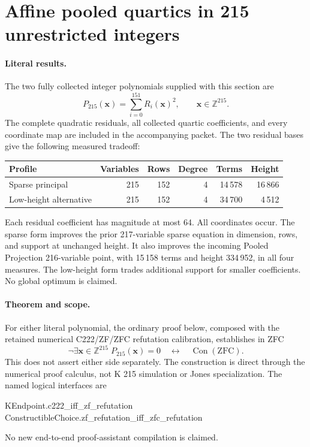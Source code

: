 \section{Affine pooled quartics in 215 unrestricted integers}
\label{sec:affine-pooled215}

\paragraph{Literal results.}
The two fully collected integer polynomials supplied with this section are
\[
 P_{215}(\boldsymbol x)=\sum_{i=0}^{151}R_i(\boldsymbol x)^2,
 \qquad \boldsymbol x\in\mathbb Z^{215}.
\]
The complete quadratic residuals, all collected quartic coefficients, and every
coordinate map are included in the accompanying packet.  The two residual
bases give the following measured tradeoff:
\begin{center}
\begin{tabular}{lrrrrr}
\hline
Profile & Variables & Rows & Degree & Terms & Height\\\hline
Sparse principal &215&152&4&14\,578&16\,866\\
Low-height alternative&215&152&4&34\,700&4\,512\\\hline
\end{tabular}
\end{center}
Each residual coefficient has magnitude at most 64.  All coordinates occur.
The sparse form improves the prior 217-variable sparse equation in dimension,
rows, and support at unchanged height.  It also improves the incoming
Pooled Projection 216-variable point, with 15\,158 terms and height 334\,952,
in all four measures.  The low-height form trades additional support for
smaller coefficients.  No global optimum is claimed.

\paragraph{Theorem and scope.}
For either literal polynomial, the ordinary proof below, composed with the
retained numerical C222/ZF/ZFC refutation calibration, establishes in ZFC
\[
 \neg\exists\boldsymbol x\in\mathbb Z^{215}\;P_{215}(\boldsymbol x)=0
 \quad\longleftrightarrow\quad\operatorname{Con}(\mathrm{ZFC}).
\]
This does not assert either side separately.  The construction is direct
through the numerical proof calculus, not K 215 simulation or Jones
specialization.  The named logical interfaces are
\begin{flushleft}\small\ttfamily
KEndpoint.c222\_iff\_zf\_refutation\\
ConstructibleChoice.zf\_refutation\_iff\_zfc\_refutation
\end{flushleft}
No new end-to-end proof-assistant compilation is claimed.

